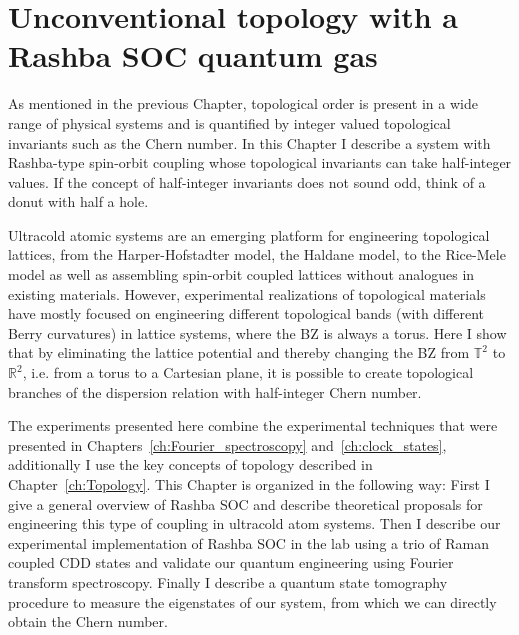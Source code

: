 
\renewcommand{\thechapter}{8}

\chapter{Unconventional topology with a Rashba SOC quantum gas}
\label{ch:Rashba}

As mentioned in the previous Chapter, topological order is present in a wide range of physical systems and is quantified by integer valued topological invariants such as the Chern number. In this Chapter I describe a system with Rashba-type spin-orbit coupling whose topological invariants can take half-integer values. If the concept of half-integer invariants does not sound odd, think of a donut with half a hole. 

Ultracold atomic systems are an emerging platform for engineering topological lattices, from the Harper-Hofstadter model\cite{miyake_realizing_2013,aidelsburger_realization_2013}, the Haldane model\cite{jotzu_experimental_2014}, to the Rice-Mele model\cite{lu_geometrical_2016,lohse_thouless_2016} as well as assembling spin-orbit coupled lattices without analogues in existing materials\cite{wu_realization_2016,sun_highly_2018}. However, experimental realizations of topological materials have mostly focused on engineering different topological bands (with different Berry curvatures) in lattice systems, where the BZ is always a torus. Here I show that by eliminating the lattice potential and thereby changing the BZ from ${\mathbb T}^2$ to ${\mathbb R}^2$, i.e. from a torus to a Cartesian plane, it is possible to create topological branches of the dispersion relation with half-integer Chern number. %

The experiments presented here combine the experimental techniques that were presented in Chapters~\ref{ch:Fourier_spectroscopy} and~\ref{ch:clock_states}, additionally I use the key concepts of topology described in Chapter~\ref{ch:Topology}. This Chapter is organized in the following way: First I give a general overview of Rashba SOC and describe theoretical proposals for engineering this type of coupling in ultracold atom systems. Then I describe our experimental implementation of Rashba SOC in the lab using a trio of Raman coupled CDD states and validate our quantum engineering using Fourier transform spectroscopy. Finally I describe a quantum state tomography procedure to measure the eigenstates of our system, from which we can directly obtain the Chern number. 

